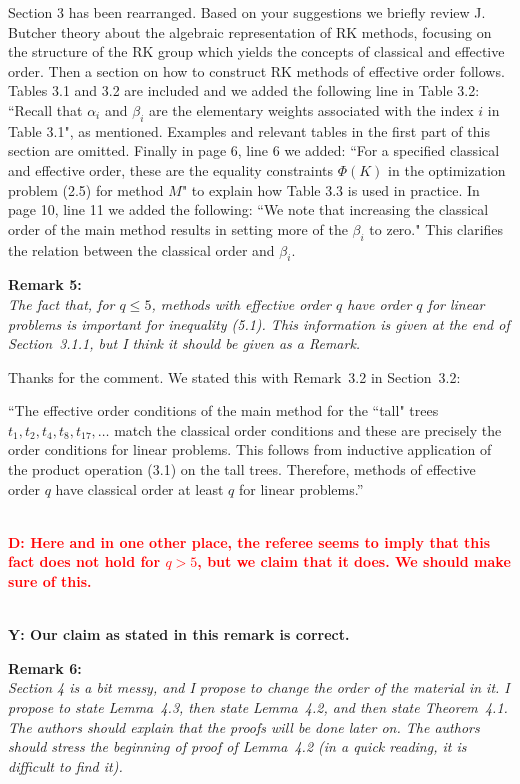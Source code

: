 \documentclass[12pt]{article}
\newcommand{\remark}[2]{\vspace{25pt} \noindent \textbf{Remark #1:\newline} \textit{#2}\vspace{15pt}}
\renewcommand{\newline}{\vspace{15pt}\\}
\newcommand{\david}[1]{\textcolor{red}{\\\textbf{D: \footnotesize #1}\\}}
\newcommand{\yiannis}[1]{\textcolor{OliveGreen}{\\\textbf{Y: \footnotesize #1}\\}}
\begin{document}
Section 3 has been rearranged. 
Based on your suggestions we briefly review J. Butcher theory about the algebraic representation
of RK methods, focusing on the structure of the RK group which yields the concepts of classical 
and effective order.
Then a section on how to construct RK methods of effective order follows.
Tables 3.1 and 3.2 are included and we added the following line in Table 3.2:
``Recall that $\alpha_i$ and $\beta_i$ are the elementary weights associated 
with the index $i$ in Table 3.1",
as mentioned.
Examples and relevant tables in the first part of this section are omitted. 
Finally in page 6, line 6 we added:
``For a specified classical and effective order, these are the equality constraints
$\Phi(K)$ in the optimization problem (2.5) for method $M$"
to explain how Table 3.3 is used in practice.
In page 10, line 11 we added the following:
``We note that increasing the classical order of the main method results
in setting more of the $\beta_i$ to zero."
This clarifies the relation between the classical order and $\beta_i$.

\pagebreak

\remark{5}{
The fact that, for $q \leq 5$, methods with effective order $q$ have order $q$ 
for linear problems is important for inequality (5.1). 
This information is given at the end of Section~3.1.1, but I think it should be given as a Remark.}

Thanks for the comment. We stated this with Remark~3.2 in Section~3.2:

``The effective order conditions of the main method for the ``tall" trees 
$t_1, t_2, t_4, t_8, t_{17}, \dots$ match the classical order conditions
and these are precisely the order conditions for linear problems.
This follows from inductive application of the product operation (3.1)
on the tall trees. 
Therefore, methods of effective order $q$ have classical order at least $q$ 
for linear problems.''

\david{Here and in one other place, the referee seems to imply that this fact does not
hold for $q>5$, but we claim that it does.  We should make sure of this.}

\yiannis{Our claim as stated in this remark is correct.}

\remark{6}{
Section 4 is a bit messy, and I propose to change the order of the material in it. 
I propose to state Lemma~4.3, then state Lemma~4.2, and then state Theorem~4.1. 
The authors should explain that the proofs will be done later on. 
The authors should stress the beginning of proof of Lemma~4.2 (in a quick reading, 
it is difficult to find it).}
\end{document}
